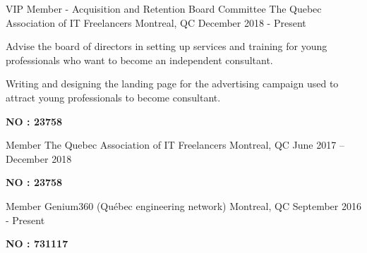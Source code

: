 
\begin{cventries}

  \cventry
    {VIP Member - Acquisition and Retention Board Committee}
    {The Quebec Association of IT Freelancers}
    {Montreal, QC}
    {December 2018 - Present}
    {
      \begin{cvitems}
        \item {Advise the board of directors in setting up services and training for young professionals who want to become an independent consultant.}
		\item {Writing and designing the landing page for the advertising campaign used to attract young professionals to become consultant.}
		\item {\textbf{NO : 23758}}
      \end{cvitems}
    }

  \cventry
    {Member}
    {The Quebec Association of IT Freelancers}
    {Montreal, QC}
    {June 2017 – December 2018}
    {
      \begin{cvitems}
		\item {\textbf{NO : 23758}}
      \end{cvitems}
    }

  \cventry
    {Member}
    {Genium360 (Québec engineering network)}
    {Montreal, QC}
    {September 2016 - Present}
    {
      \begin{cvitems}
		\item {\textbf{NO : 731117}}
      \end{cvitems}
    }

\end{cventries}